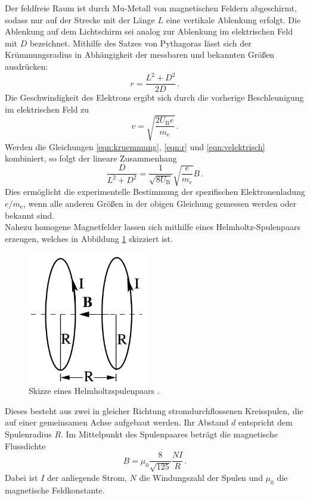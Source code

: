 Der feldfreie Raum ist durch Mu-Metall von magnetischen Feldern abgeschirmt, sodass
nur auf der Strecke mit der Länge $L$ eine vertikale Ablenkung erfolgt. Die Ablenkung
auf dem Lichtschirm sei analog zur Ablenkung im elektrischen Feld mit $D$ bezeichnet.
Mithilfe des Satzes von Pythagoras lässt sich der Krümmungsradius in Abhängigkeit
der messbaren und bekannten Größen ausdrücken:
\begin{equation}
  r = \frac{L^2 + D^2}{2 D}\,.
  \label{eqn:r}
\end{equation}
Die Geschwindigkeit des Elektrons ergibt sich durch die vorherige Beschleunigung
im elektrischen Feld zu
\begin{equation}
  v = \sqrt{\frac{2 U_\text{B} e}{m_\text{e}}}\,.
  \label{eqn:velektrisch}
\end{equation}
Werden die Gleichungen \eqref{eqn:kruemmung}, \eqref{eqn:r} und \eqref{eqn:velektrisch}
kombiniert, so folgt der lineare Zusammenhang
\begin{equation}
  \frac{D}{L^2 + D^2} = \frac{1}{\sqrt{8 U_\text{B}}} \sqrt{\frac{e}{m_\text{e}}} B\,.
  \label{eqn:elektronenladung}
\end{equation}
Dies ermöglicht die experimentelle Bestimmung der spezifischen Elektronenladung
$e/m_\text{e}$, wenn alle anderen Größen in der obigen Gleichung gemessen werden
oder bekannt sind. \\

Nahezu homogene Magnetfelder lassen sich mithilfe eines Helmholtz-Spulenpaars erzeugen, welches
in Abbildung \ref{fig:helmholtz} skizziert ist.

\begin{figure}
  \centering
  \includegraphics[width=150pt]{data/helmholtz.png}
  \caption{Skizze eines Helmholtzspulenpaars \cite{Versuchsanleitung308}.}
  \label{fig:helmholtz}
\end{figure}

Dieses besteht aus zwei in gleicher Richtung stromdurchflossenen Kreisspulen, die
auf einer gemeinsamen Achse aufgebaut werden. Ihr Abstand $d$ entspricht dem Spulenradius $R$.
Im Mittelpunkt des Spulenpaares beträgt die magnetische Flussdichte
\begin{equation}
  B = \mu_0 \frac{8}{\sqrt{125}} \frac{N I}{R}\,.
  \label{eqn:helmholtz}
\end{equation}
Dabei ist $I$ der anliegende Strom, $N$ die Windungszahl der Spulen und $\mu_0$
die magnetische Feldkonstante.
